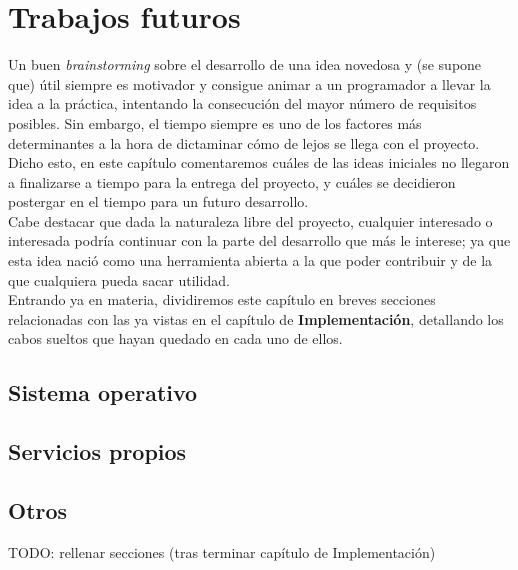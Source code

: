 \chapter{Trabajos futuros}

Un buen \textit{brainstorming} sobre el desarrollo de una idea novedosa y (se supone que) útil siempre es motivador y consigue animar a un programador a llevar la idea a la práctica, intentando la consecución del mayor número de requisitos posibles. Sin embargo, el tiempo siempre es uno de los factores más determinantes a la hora de dictaminar cómo de lejos se llega con el proyecto.\\

Dicho esto, en este capítulo comentaremos cuáles de las ideas iniciales no llegaron a finalizarse a tiempo para la entrega del proyecto, y cuáles se decidieron postergar en el tiempo para un futuro desarrollo.\\

Cabe destacar que dada la naturaleza libre del proyecto, cualquier interesado o interesada podría continuar con la parte del desarrollo que más le interese; ya que esta idea nació como una herramienta abierta a la que poder contribuir y de la que cualquiera pueda sacar utilidad.\\

Entrando ya en materia, dividiremos este capítulo en breves secciones relacionadas con las ya vistas en el capítulo de \textbf{Implementación}, detallando los cabos sueltos que hayan quedado en cada uno de ellos.

\section{Sistema operativo}

\section{Servicios propios}

\section{Otros}

TODO: rellenar secciones (tras terminar capítulo de Implementación)